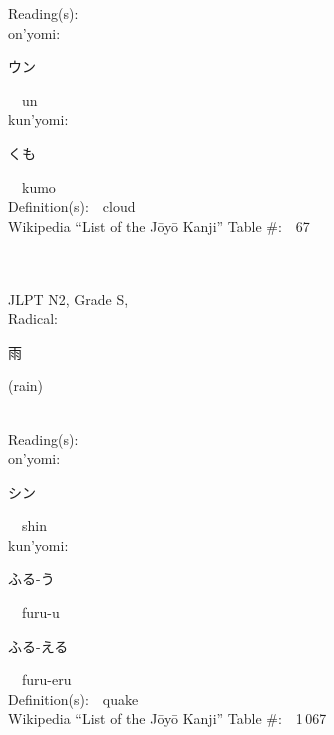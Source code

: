 \begin{multicols}{2}
Reading(s):\ \ \\
{\hspace*{1em}}on'yomi:\ \ \\
{\hspace*{2em}}{\begin{CJK}{UTF8}{min} ウン \end{CJK}}\ \ un\ \ \\
{\hspace*{1em}}kun'yomi:\ \ \\
{\hspace*{2em}}{\begin{CJK}{UTF8}{min} くも \end{CJK}}\ \ kumo\ \ \\
Definition(s):\ \ cloud \\
Wikipedia ``List of the J\=oy\=o Kanji'' Table \#:\ \ 67 \\
\ \ \\
{\fontsize{34pt}{40pt}  }\ \ \\  %
{JLPT N2, Grade S, \\Radical:\ \ {\begin{CJK}{UTF8}{min} 雨 \end{CJK}} (rain) } \\
Reading(s):\ \ \\
{\hspace*{1em}}on'yomi:\ \ \\
{\hspace*{2em}}{\begin{CJK}{UTF8}{min} シン \end{CJK}}\ \ shin\ \ \\
{\hspace*{1em}}kun'yomi:\ \ \\
{\hspace*{2em}}{\begin{CJK}{UTF8}{min} ふる-う \end{CJK}}\ \ furu-u\ \ \\
{\hspace*{2em}}{\begin{CJK}{UTF8}{min} ふる-える \end{CJK}}\ \ furu-eru\ \ \\
Definition(s):\ \ quake \\
Wikipedia ``List of the J\=oy\=o Kanji'' Table \#:\ \ 1\,067 \\

\end{multicols}
